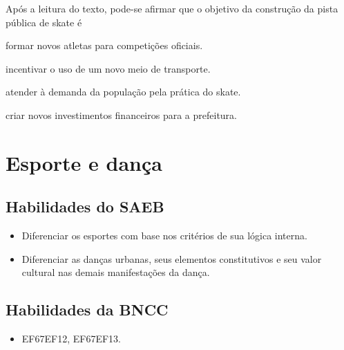Após a leitura do texto, pode-se afirmar que o objetivo da construção da 
pista pública de skate é

\begin{escolha}
\item formar novos atletas para competições oficiais.

\item incentivar o uso de um novo meio de transporte.

\item atender à demanda da população pela prática do skate.

\item criar novos investimentos financeiros para a prefeitura.
\end{escolha}

\chapter{Esporte e dança}


\section{Habilidades do SAEB}

\begin{itemize}
\item
  Diferenciar os esportes com base nos critérios de sua lógica interna.
\item
  Diferenciar as danças urbanas, seus elementos constitutivos e seu
  valor cultural nas demais manifestações da dança.
\end{itemize}

\section{Habilidades da BNCC}

\begin{itemize}
\item EF67EF12, EF67EF13.
\end{itemize}



